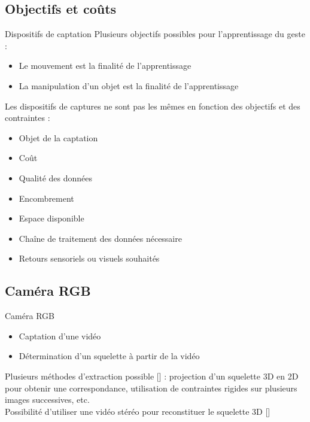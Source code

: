 \documentclass[svgnames]{beamer}
\newcommand{\mycite}[1]{[\textit{\cite{#1}}]}
\begin{document}
	\subsection{Objectifs et coûts}
	\begin{frame}{Dispositifs de captation}
		Plusieurs objectifs possibles pour l'apprentissage du geste :
		\begin{itemize}[label=$\bullet$]
			\item Le mouvement est la finalité de l'apprentissage
			\item La manipulation d'un objet est la finalité de l'apprentissage 
		\end{itemize}
		
		Les dispositifs de captures ne sont pas les mêmes en fonction des objectifs et des contraintes :
		\begin{itemize}[label=$\bullet$]
			\item Objet de la captation
			\item Coût
			\item Qualité des données
			\item Encombrement
			\item Espace disponible
			\item Chaîne de traitement des données nécessaire
			\item Retours sensoriels ou visuels souhaités
		\end{itemize}
	\end{frame}
	
	\subsection{Caméra RGB}
	\begin{frame}{\subsecname}
		\begin{block}{Caméra RGB}
			\begin{itemize}[label=$\bullet$]
				\item Captation d'une vidéo
				\item Détermination d'un squelette à partir de la vidéo
			\end{itemize}
			Plusieurs méthodes d'extraction possible \mycite{Sarafianos2016DHp} : projection d'un squelette 3D en 2D pour obtenir une correspondance, utilisation de contraintes rigides sur plusieurs images successives, etc.\\
			Possibilité d'utiliser une vidéo stéréo pour reconstituer le squelette 3D \mycite{Liu2016Tb3}
		\end{block}
	\end{frame}
	
\end{document}
